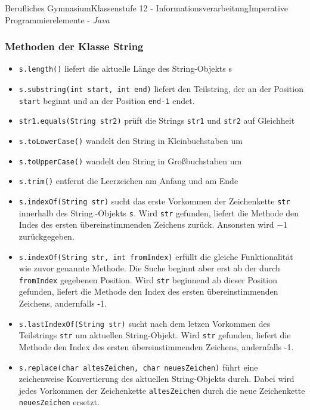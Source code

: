 \documentclass[oneside,openany,headings=optiontotoc,11pt,numbers=noenddot]{article}
\begin{document}
\begin{worksheet}{Berufliches Gymnasium}{Klassenstufe 12 - Informationsverarbeitung}{Imperative Programmierelemente - \textit{Java}}
		\subsubsection*{Methoden der Klasse String}
		\begin{itemize}
			\item \lstinline[style=JavaInputStyle]|s.length()| liefert die aktuelle Länge des String-Objekts s
			\item \lstinline[style=JavaInputStyle]|s.substring(int start, int end)| liefert den Teilstring, der an der Position \lstinline[style=JavaInputStyle]|start| beginnt und an der Position \lstinline[style=JavaInputStyle]|end-1| endet.
			\item \lstinline[style=JavaInputStyle]|str1.equals(String str2)| prüft die Strings \lstinline[style=JavaInputStyle]|str1| und \lstinline[style=JavaInputStyle]|str2| auf Gleichheit
			\item \lstinline[style=JavaInputStyle]|s.toLowerCase()| wandelt den String in Kleinbuchstaben um
			\item \lstinline[style=JavaInputStyle]|s.toUpperCase()| wandelt den String in Großbuchstaben um
			\item \lstinline[style=JavaInputStyle]|s.trim()| entfernt die Leerzeichen am Anfang und am Ende
			\item \lstinline[style=JavaInputStyle]|s.indexOf(String str)| sucht das erste Vorkommen der Zeichenkette \lstinline[style=JavaInputStyle]|str| innerhalb des String.-Objekts \lstinline[style=JavaInputStyle]|s|. Wird \lstinline[style=JavaInputStyle]|str| gefunden, liefert die Methode den Indes des ersten übereinstimmenden Zeichens zurück. Ansonsten wird \(-1\) zurückgegeben.
			\item \lstinline[style=JavaInputStyle]|s.indexOf(String str, int fromIndex)| erfüllt die gleiche Funktionalität wie zuvor genannte Methode. Die Suche beginnt aber erst ab der durch \lstinline[style=JavaInputStyle]|fromIndex| gegebenen Position. Wird \lstinline[style=JavaInputStyle]|str| beginnend ab dieser Position gefunden, liefert die Methode den Index des ersten übereinstimmenden Zeichens, andernfalls -1.
			\item \lstinline[style=JavaInputStyle]|s.lastIndexOf(String str)| sucht nach dem letzen Vorkommen des Teilstrings \lstinline[style=JavaInputStyle]|str| um aktuellen String-Objekt. Wird \lstinline[style=JavaInputStyle]|str| gefunden, liefert die Methode den Index des ersten übereinstimmenden Zeichens, andernfalls -1.
			\item \lstinline[style=JavaInputStyle]|s.replace(char altesZeichen, char neuesZeichen)| führt eine zeichenweise Konvertierung des aktuellen String-Objekts durch. Dabei wird jedes Vorkommen der Zeichenkette \lstinline[style=JavaInputStyle]|altesZeichen| durch die neue Zeichenkette \lstinline[style=JavaInputStyle]|neuesZeichen| ersetzt.

\end{itemize}
\end{worksheet}
\end{document}
